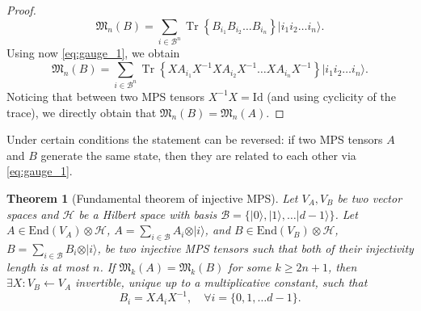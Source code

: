 \documentclass{article}
\newtheorem{theorem}{Theorem}
\newcommand{\tr}{\operatorname{Tr}}
\newcommand{\id}{\mathrm{Id}}
\newcommand{\End}{\mathrm{End}}
\newcommand{\ket}[1]{\vert #1 \rangle}
\begin{document}
\begin{proof}
  \begin{equation*}
    \mathfrak{M}_n(B) = \sum_{i\in \mathcal{B}^n} \tr\left\{B_{i_1} B_{i_2} \dots B_{i_n}\right\} \ket{i_1 i_2 \dots i_n}.
  \end{equation*}
  Using now \cref{eq:gauge_1}, we obtain   
  \begin{equation*}
    \mathfrak{M}_n(B) = \sum_{i\in \mathcal{B}^n} \tr\left\{XA_{i_1}X^{-1} XA_{i_2}X^{-1} \dots XA_{i_n}X^{-1}\right\} \ket{i_1 i_2 \dots i_n}.
  \end{equation*}
  Noticing that between two MPS tensors $X^{-1}X=\id$ (and using cyclicity of the trace), we directly obtain  that $\mathfrak{M}_n(B) = \mathfrak{M}_n(A)$.
\end{proof}

Under certain conditions the statement can be reversed: if two MPS tensors $A$ and $B$ generate the same state, then they are related to each other via \cref{eq:gauge_1}. 


\begin{theorem}[Fundamental theorem of injective MPS]\label{thm:fundamental}
    Let $V_A, V_B$ be two vector spaces and $\mathcal{H}$ be a Hilbert space with basis $\mathcal{B} = \{\ket{0},\ket{1},\dots \ket{d-1}\}$. Let $A\in \End(V_A)\otimes \mathcal{H}$, $A = \sum_{i\in \mathcal{B}} A_i \otimes \ket{i}$, and $B\in \End(V_B)\otimes \mathcal{H}$, $B = \sum_{i\in \mathcal{B}} B_i \otimes \ket{i}$, be two injective MPS tensors such that both of their injectivity length is at most $n$. If $\mathfrak{M}_k(A) = \mathfrak{M}_k(B)$ for some $k\geq 2n+1$,  then $\exists X: V_B \leftarrow V_A$ invertible, unique up to a multiplicative constant, such that 
    \begin{equation*}
       B_i = X A_i X^{-1}, \quad \forall i = \{0,1,\dots d-1\}.
    \end{equation*}
\end{theorem}
\end{document}
